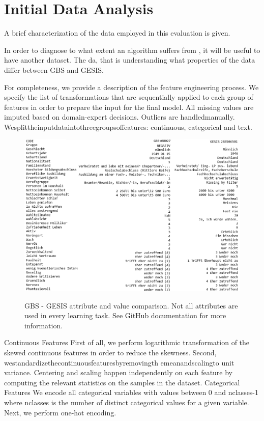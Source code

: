\chapter{Initial Data Analysis}\label{Sec:Initial Data Analysis}

A brief characterization of the data employed in this evaluation is given. 

In order to diagnose to what extent an algorithm suffers from , it will be useful to have another dataset.
The da, that is understanding what properties of the data differ between GBS and GESIS. 

For completeness, we provide a description of the feature engineering process. We specify the list of transformations that are sequentially applied to each group of features in order to prepare the input for the ﬁnal model. All
missing values are imputed based on domain-expert decisions. Outliers are handledmanually. Wesplittheinputdataintothreegroupsoffeatures: continuous, categorical and text.

\begin{figure}[ht]
	\begin{center}
		\includegraphics[scale=0.53,angle=0]{fig/values_compare}
		\label{std}
		\caption{GBS - GESIS attribute and value comparison. Not all attributes are used in every learning task. See GitHub documentation for more information.}
	\end{center}
\end{figure}

Continuous Features First of all, we perform logarithmic transformation of the skewed continuous features in order to reduce the skewness. Second, westandardizethecontinuousfeaturesbyremovingth emeanandscalingto unit variance. Centering and scaling happen independently on each feature by computing the relevant statistics on the samples in the dataset.
Categorical Features We encode all categorical variables with values between 0 and nclasses-1 where nclasses is the number of distinct categorical values for a given variable. Next, we perform one-hot encoding.

